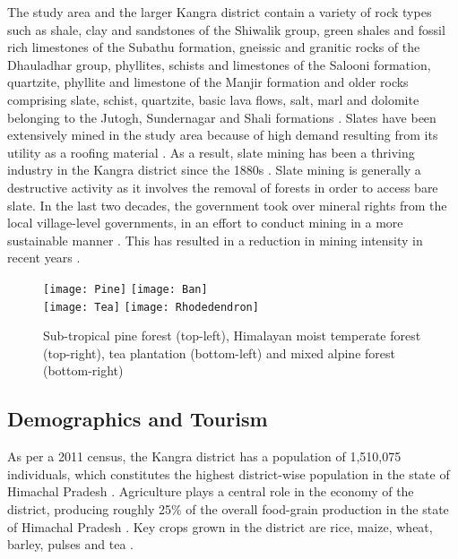 \justify
The study area and the larger Kangra district contain a variety of rock types such as shale, clay and sandstones of the Shiwalik group, green shales and fossil rich limestones of the Subathu formation, gneissic and granitic rocks of the Dhauladhar group, phyllites, schists and limestones of the Salooni formation, quartzite, phyllite and limestone of the Manjir formation and older rocks comprising slate, schist, quartzite, basic lava flows, salt, marl and dolomite belonging to the Jutogh,
Sundernagar and Shali formations . Slates have been extensively mined in the study area because of high demand resulting from its utility as a roofing material . As a result, slate mining has been a thriving industry in the Kangra district since the 1880s . Slate mining is generally a destructive activity as it involves the removal of forests in order to access bare slate. In the last two decades, the government took over mineral rights from the local village-level governments, in an effort to conduct mining in a more sustainable manner . This has resulted in a reduction in mining intensity in recent years .\vspace{5pt}

\begin{figure}[H]
	\centering
	\texttt{[image: Pine]}
	\texttt{[image: Ban]} \\ [3pt]
	\texttt{[image: Tea]}
	\texttt{[image: Rhodedendron]}
	\centering
	\caption{Sub-tropical pine forest (top-left), Himalayan moist temperate forest (top-right), tea plantation (bottom-left) and mixed alpine forest (bottom-right)}\label{Fig3}
\end{figure}
\vspace{-12pt}

\subsection{Demographics and Tourism}

\justify
As per a 2011 census, the Kangra district has a population of 1,510,075 individuals, which constitutes the highest district-wise population in the state of Himachal Pradesh . Agriculture plays a central role in the economy of the district, producing roughly 25$\%$ of the overall food-grain production in the state of Himachal Pradesh . Key crops grown in the district are rice, maize, wheat, barley, pulses and tea .

